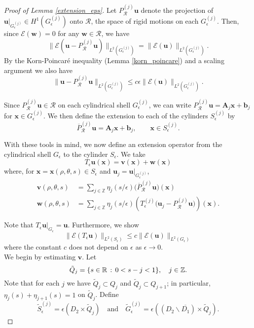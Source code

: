 \documentclass[11pt]{article}
\numberwithin{equation}{section}
\newcommand{\R}{\mathbb{R}}
\newcommand{\Z}{\mathbb{Z}}
\newcommand{\E}{\mathcal{E}}
\newcommand{\sR}{\mathcal{R}}
\newcommand{\bu}{\bm{u}}
\newcommand{\bw}{\bm{w}}
\newcommand{\bx}{\bm{x}}
\newcommand{\bv}{\bm{v}}
\newcommand{\ts}{\thinspace}
\theoremstyle{definition}
\begin{document}
\begin{proof}[Proof of Lemma \ref{extension_eps}]
Let $P_{\sR}^{(j)}\bu$ denote the projection of $\bu\big|_{G^{(j)}_{\epsilon}}\in H^1(G^{(j)}_{\epsilon})$ onto $\sR$, the space of rigid motions on each $G^{(j)}_{\epsilon}$. Then, since $\E(\bw)= 0$ for any $\bw\in \sR$, we have 
 \[ \|\E(\bu - P_{\sR}^{(j)}\bu)\|_{L^2(G^{(j)}_{\epsilon})} =\|\E(\bu)\|_{L^2(G^{(j)}_{\epsilon})}. \]
By the Korn-Poincar\'e inequality (Lemma \ref{korn_poincare}) and a scaling argument we also have 
\begin{equation}\label{poincare_est}
  \|\bu - P_{\sR}^{(j)}\bu\|_{L^2(G^{(j)}_{\epsilon})} \le c\epsilon\|\E(\bu)\|_{L^2(G^{(j)}_{\epsilon})}.
\end{equation}

Since $P^{(j)}_{\sR}\bu\in \sR$ on each cylindrical shell $G_{\epsilon}^{(j)}$, we can write $P^{(j)}_{\sR}\bu= \bm{A}_j\bx+\bm{b}_j$ for $\bx\in G_{\epsilon}^{(j)}$. We then define the extension to each of the cylinders $S_{\epsilon}^{(j)}$ by 
\begin{equation}\label{PR_on_S}
\overline P_{\sR}^{(j)}\bu =\bm{A}_j\bx+ \bm{b}_j, \qquad \bx\in S_{\epsilon}^{(j)}.
\end{equation}
  
With these tools in mind, we now define an extension operator from the cylindrical shell $G_{\epsilon}$ to the cylinder $S_{\epsilon}$. We take 
 \begin{equation}\label{ext_operator}
  T_{\epsilon}\bu(\bx) = \bv(\bx)+ \bw(\bx) 
  \end{equation}
 where, for $\bx=\bx(\rho,\theta,s)\in S_{\epsilon}$ and $\bu_j = \bu|_{G^{(j)}_{\epsilon}}$, 
 \begin{align*}
 \bv(\rho,\theta,s) &= \sum_{j\in \Z} \eta_j(s/\epsilon)\bigg(\overline P_{\sR}^{(j)}\bu\bigg)(\bx) \\
 \bw(\rho,\theta,s) &= \sum_{j\in \Z} \eta_j(s/\epsilon)\left(T_{\epsilon}^{(j)}\big(\bu_j -P_{\sR}^{(j)}\bu\big)\right)(\bx).
 \end{align*}
 
Note that $T_{\epsilon}\bu \big|_{G_{\epsilon}}=\bu$. Furthermore, we show
\begin{equation}\label{ext_est_1}
 \|\E(T_{\epsilon}\bu)\|_{L^2(S_{\epsilon})} \le c\| \E(\bu)\|_{L^2(G_{\epsilon})} 
 \end{equation}
where the constant $c$ does not depend on $\epsilon$ as $\epsilon \to 0$. \\

We begin by estimating $\bv$. Let
\[\tilde Q_j = \{s\in\R \ts:\ts 0 <s-j<1\}, \quad j\in \Z.\]
Note that for each $j$ we have $\tilde Q_j\subset Q_j$ and $\tilde Q_j\subset Q_{j+1}$; in particular, $\eta_j(s)+\eta_{j+1}(s)=1$ on $\tilde Q_j$. Define
\[ \tilde S_{\epsilon}^{(j)} = \epsilon\left(D_{2}\times \tilde Q_j \right) \quad \text{and}\quad\tilde G_{\epsilon}^{(j)} = \epsilon\left((D_{2}\backslash \overline{D_1})\times \tilde Q_j \right).\]


\end{proof}
\end{document}
